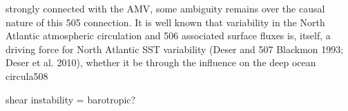  strongly connected with the AMV, some ambiguity remains over the causal nature of this 505 connection. It is well known that variability in the North Atlantic atmospheric circulation and 506 associated surface fluxes is, itself, a driving force for North Atlantic SST variability (Deser and 507 Blackmon 1993; Deser et al. 2010), whether it be through the influence on the deep ocean circula508

shear instability = barotropic?





